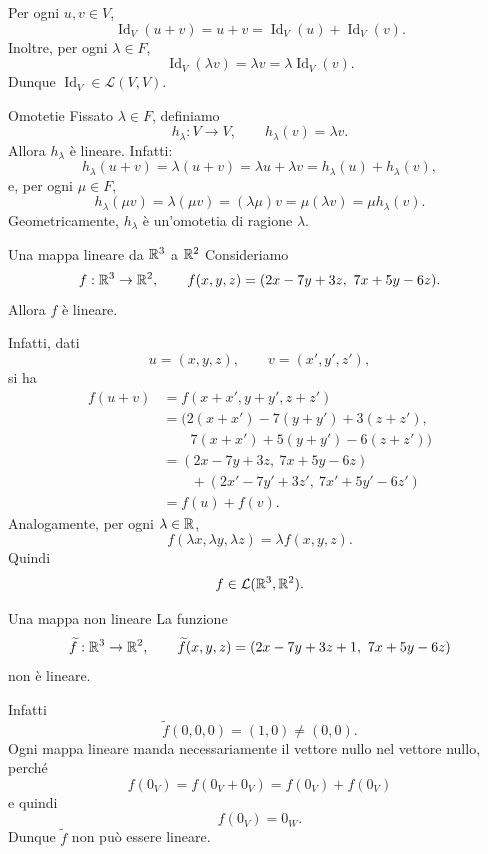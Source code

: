 \documentclass[a4paper]{article}
\begin{document}
\begin{snippetproof}{}
    Per ogni \(u,v\in V\),
    \[
        \operatorname{Id}_V(u+v)=u+v=\operatorname{Id}_V(u)+\operatorname{Id}_V(v).
    \]
    Inoltre, per ogni \(\lambda\in F\),
    \[
        \operatorname{Id}_V(\lambda v)=\lambda v=\lambda\operatorname{Id}_V(v).
    \]
    Dunque \(\operatorname{Id}_V\in\mathcal{L}(V,V)\).
\end{snippetproof}

\begin{snippetexample}{Omotetie}
    Fissato \(\lambda\in F\), definiamo
    \[
        h_\lambda:V\to V,
        \qquad
        h_\lambda(v)=\lambda v.
    \]
    Allora \(h_\lambda\) è lineare. Infatti:
    \[
        h_\lambda(u+v)=\lambda(u+v)=\lambda u+\lambda v=h_\lambda(u)+h_\lambda(v),
    \]
    e, per ogni \(\mu\in F\),
    \[
        h_\lambda(\mu v)=\lambda(\mu v)=(\lambda\mu)v=\mu(\lambda v)=\mu h_\lambda(v).
    \]
    Geometricamente, \(h_\lambda\) è un'omotetia di ragione \(\lambda\).
\end{snippetexample}

\begin{snippetexample}{Una mappa lineare da \(\mathbb{R}^3\) a \(\mathbb{R}^2\)}
    Consideriamo
    \[
        f:\mathbb{R}^3\to\mathbb{R}^2,
        \qquad
        f(x,y,z)=(2x-7y+3z,\ 7x+5y-6z).
    \]
    Allora \(f\) è lineare.

    Infatti, dati
    \[
        u=(x,y,z),
        \qquad
        v=(x',y',z'),
    \]
    si ha
    \begin{align*}
        f(u+v)
        &=f(x+x',y+y',z+z')\\
        &=
        \bigl(2(x+x')-7(y+y')+3(z+z'),\\
        &\qquad 7(x+x')+5(y+y')-6(z+z')\bigr)\\
        &=
        (2x-7y+3z,\ 7x+5y-6z)\\
        &\qquad+
        (2x'-7y'+3z',\ 7x'+5y'-6z')\\
        &=f(u)+f(v).
    \end{align*}
    Analogamente, per ogni \(\lambda\in\mathbb{R}\),
    \[
        f(\lambda x,\lambda y,\lambda z)
        =
        \lambda f(x,y,z).
    \]
    Quindi
    \[
        f\in\mathcal{L}(\mathbb{R}^3,\mathbb{R}^2).
    \]
\end{snippetexample}

\begin{snippetexample}{Una mappa non lineare}
    La funzione
    \[
        \widetilde{f}:\mathbb{R}^3\to\mathbb{R}^2,
        \qquad
        \widetilde{f}(x,y,z)
        =
        (2x-7y+3z+1,\ 7x+5y-6z)
    \]
    non è lineare.

    Infatti
    \[
        \widetilde{f}(0,0,0)=(1,0)\neq (0,0).
    \]
    Ogni mappa lineare manda necessariamente il vettore nullo nel vettore nullo, perché
    \[
        f(0_V)=f(0_V+0_V)=f(0_V)+f(0_V)
    \]
    e quindi
    \[
        f(0_V)=0_W.
    \]
    Dunque \(\widetilde{f}\) non può essere lineare.
\end{snippetexample}
\end{document}
